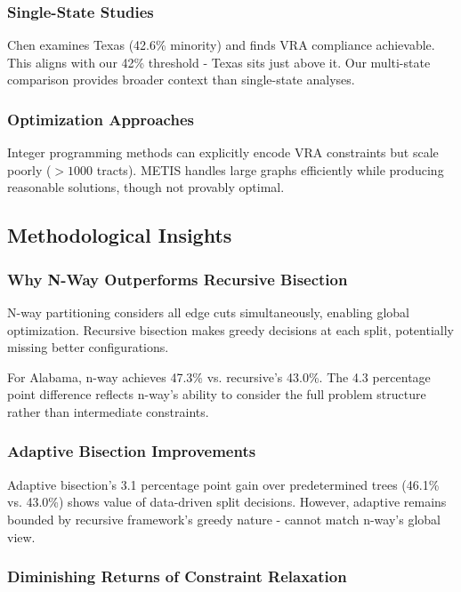 \subsubsection{Single-State Studies}

Chen \citep{chen2020texas} examines Texas (42.6\% minority) and finds VRA compliance achievable. This aligns with our 42\% threshold - Texas sits just above it. Our multi-state comparison provides broader context than single-state analyses.

\subsubsection{Optimization Approaches}

Integer programming methods \citep{shirabe2005} can explicitly encode VRA constraints but scale poorly ($>1000$ tracts). METIS handles large graphs efficiently while producing reasonable solutions, though not provably optimal.

\subsection{Methodological Insights}

\subsubsection{Why N-Way Outperforms Recursive Bisection}

N-way partitioning considers all edge cuts simultaneously, enabling global optimization. Recursive bisection makes greedy decisions at each split, potentially missing better configurations.

For Alabama, n-way achieves 47.3\% vs. recursive's 43.0\%. The 4.3 percentage point difference reflects n-way's ability to consider the full problem structure rather than intermediate constraints.

\subsubsection{Adaptive Bisection Improvements}

Adaptive bisection's 3.1 percentage point gain over predetermined trees (46.1\% vs. 43.0\%) shows value of data-driven split decisions. However, adaptive remains bounded by recursive framework's greedy nature - cannot match n-way's global view.

\subsubsection{Diminishing Returns of Constraint Relaxation}

